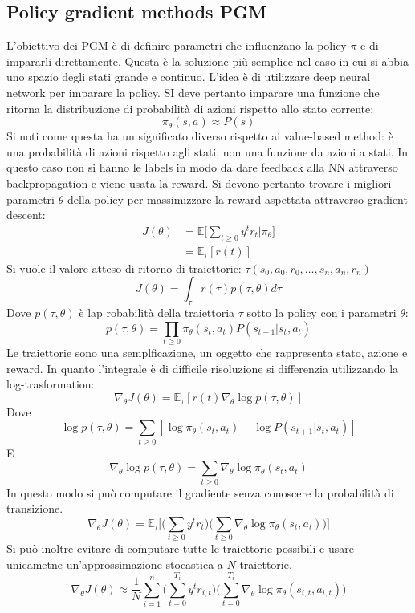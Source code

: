 	\subsection{Policy gradient methods PGM}
	L'obiettivo dei PGM \`e di definire parametri che influenzano la policy $\pi$ e di impararli direttamente.
	Questa \`e la soluzione pi\`u semplice nel caso in cui si abbia uno spazio degli stati grande e continuo.
	L'idea \`e di utilizzare deep neural network per imparare la policy.
	SI deve pertanto imparare una funzione che ritorna la distribuzione di probabilit\`a di azioni rispetto allo stato corrente:
	$$\pi_\theta(s,a)\approx P(s)$$
	Si noti come questa ha un significato diverso rispetto ai value-based method: \`e una probabilit\`a di azioni rispetto agli stati, non una funzione da azioni a stati.
	In questo caso non si hanno le labels in modo da dare feedback alla NN attraverso backpropagation e viene usata la reward.
	Si devono pertanto trovare i migliori parametri $\theta$ della policy per massimizzare la reward aspettata attraverso gradient descent:
	\begin{align*}
		J(\theta) &= \mathbb{E}\biggl[\sum\limits_{t\ge 0}y^tr_t|\pi_\theta\biggr]\\
	  		 &=\mathbb{E}_\tau[r(t)]
	\end{align*}
	Si vuole il valore atteso di ritorno di traiettorie: $\tau(s_0,a_0,r_0, \dots, s_n,a_n,r_n)$
	$$J(\theta) = \int_\tau r(\tau)p(\tau,\theta)d\tau$$
	Dove $p(\tau,\theta)$ \`e lap robabilit\`a della traiettoria $\tau$ sotto la policy con i parametri $\theta$:
	$$p(\tau,\theta) = \prod\limits_{t\ge 0}\pi_\theta(s_t,a_t)P(s_{t+1}|s_t,a_t)$$
	Le traiettorie sono una semplficazione, un oggetto che rappresenta stato, azione e reward.
	In quanto l'integrale \`e di difficile risoluzione si differenzia utilizzando la log-trasformation:
	$$\nabla_\theta J(\theta) =\mathbb{E}_\tau[r(t)\nabla_\theta\log p(\tau,\theta)]$$
	Dove
	$$\log p(\tau,\theta) = \sum\limits_{t\ge 0} [\log \pi_\theta(s_t,a_t) + \log P(s_{t+1}|s_t,a_t)]$$
	E
	$$\nabla_\theta \log p(\tau,\theta) = \sum\limits_{t\ge 0}\nabla_\theta \log\pi_\theta(s_t,a_t)$$
	In questo modo si pu\`o computare il gradiente senza conoscere la probabilit\`a di transizione.
	$$\nabla_\theta J(\theta) = \mathbb{E}_\tau\biggl[\biggl(\sum\limits_{t\ge 0}y^tr_t\biggr)\biggl(\sum\limits_{t\ge 0}\nabla_\theta\log\pi_\theta(s_t,a_t)\biggr)\biggr]$$
	Si pu\`o inoltre evitare di computare tutte le traiettorie possibili e usare unicametne un'approssimazione stocastica a $N$ traiettorie.
	$$\nabla_\theta J(\theta) \approx \dfrac{1}{N}\sum\limits_{i=1}^n\biggl(\sum\limits_{t = 0}^{T_i}y^tr_{i,t}\biggr)\biggl(\sum\limits_{t= 0}^{T_i}\nabla_\theta\log\pi_\theta(s_{i,t},a_{i,t})\biggr)$$

